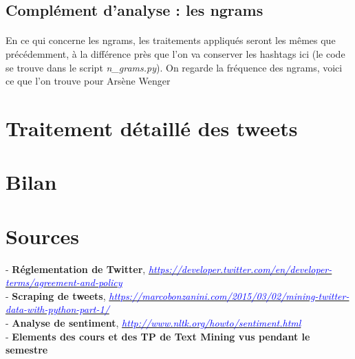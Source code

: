 \documentclass[14pt, openany]{article}
\begin{document}
\subsection{Complément d'analyse : les ngrams}
\paragraph{}
En ce qui concerne les ngrams, les traitements appliqués seront les mêmes que précédemment, à la différence près que l'on va conserver les hashtags ici (le code se trouve dans le script \textit{n\_grams.py}). On regarde la fréquence des ngrams, voici ce que l'on trouve pour Arsène Wenger
\section{Traitement détaillé des tweets}

\section{Bilan}

\section{Sources}
\begin{flushleft}
- \textbf{Réglementation de Twitter}, \href{https://developer.twitter.com/en/developer-terms/agreement-and-policy}{\textit{\textcolor{blue}{https://developer.twitter.com/en/developer-terms/agreement-and-policy}}}\\
\medskip
- \textbf{Scraping de tweets}, \href{https://marcobonzanini.com/2015/03/02/mining-twitter-data-with-python-part-1/}{\textit{\textcolor{blue}{https://marcobonzanini.com/2015/03/02/mining-twitter-data-with-python-part-1/}}}\\
\medskip
- \textbf{Analyse de sentiment}, \href{http://www.nltk.org/howto/sentiment.html}{\textit{\textcolor{blue}{http://www.nltk.org/howto/sentiment.html}}}\\
\medskip
- \textbf{Elements des cours et des TP de Text Mining vus pendant le semestre} 
\end{flushleft}
\end{document}
